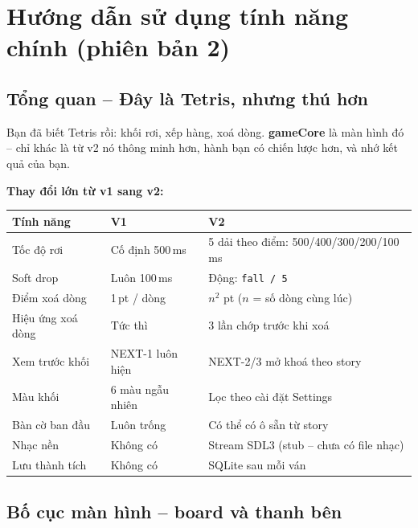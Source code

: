 \documentclass[12pt,a4paper]{article}
\begin{document}
\section{Hướng dẫn sử dụng tính năng chính (phiên bản 2)}

\subsection{Tổng quan -- Đây là Tetris, nhưng thú hơn}

Bạn đã biết Tetris rồi: khối rơi, xếp hàng, xoá dòng. \textbf{gameCore}
là màn hình đó -- chỉ khác là từ v2 nó thông minh hơn, hành bạn có
chiến lược hơn, và nhớ kết quả của bạn.

\vspace{4pt}
\noindent\textbf{Thay đổi lớn từ v1 sang v2:}

\vspace{4pt}
\begin{tabularx}{\linewidth}{|l|l|X|}
    \hline
    \textbf{Tính năng}    & \textbf{V1}           & \textbf{V2} \\
    \hline
    Tốc độ rơi            & Cố định 500\,ms       & 5 dải theo điểm: 500/400/300/200/100\,ms \\
    \hline
    Soft drop             & Luôn 100\,ms          & Động: \texttt{fall\,/\,5} \\
    \hline
    Điểm xoá dòng         & 1\,pt / dòng          & $n^2$ pt ($n$ = số dòng cùng lúc) \\
    \hline
    Hiệu ứng xoá dòng     & Tức thì               & 3 lần chớp trước khi xoá \\
    \hline
    Xem trước khối        & NEXT-1 luôn hiện      & NEXT-2/3 mở khoá theo story \\
    \hline
    Màu khối              & 6 màu ngẫu nhiên      & Lọc theo cài đặt Settings \\
    \hline
    Bàn cờ ban đầu        & Luôn trống            & Có thể có ô sẵn từ story \\
    \hline
    Nhạc nền              & Không có              & Stream SDL3 (stub -- chưa có file nhạc) \\
    \hline
    Lưu thành tích        & Không có              & SQLite sau mỗi ván \\
    \hline
\end{tabularx}

\subsection{Bố cục màn hình -- board và thanh bên}
\end{document}
